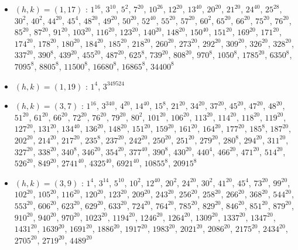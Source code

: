 \begin{itemize}
\item $(h,k)=(1,17)$ : $1^{16}$, $3^{10}$, $5^{2}$, $7^{20}$, $10^{26}$, $12^{20}$, $13^{40}$, $20^{20}$, $21^{20}$, $24^{40}$, $25^{28}$, $30^{2}$, $40^{2}$, $44^{20}$, $45^{4}$, $48^{20}$, $49^{20}$, $50^{20}$, $52^{40}$, $55^{20}$, $57^{20}$, $60^{2}$, $65^{20}$, $66^{20}$, $75^{20}$, $76^{20}$, $85^{20}$, $87^{20}$, $91^{20}$, $103^{20}$, $116^{20}$, $123^{20}$, $140^{20}$, $148^{20}$, $150^{40}$, $151^{20}$, $169^{20}$, $171^{20}$, $174^{20}$, $178^{20}$, $180^{20}$, $184^{20}$, $185^{20}$, $218^{20}$, $260^{20}$, $273^{20}$, $292^{20}$, $309^{20}$, $326^{20}$, $328^{20}$, $337^{20}$, $390^{8}$, $439^{20}$, $455^{20}$, $487^{20}$, $625^{8}$, $739^{20}$, $808^{20}$, $970^{8}$, $1050^{8}$, $1785^{20}$, $6350^{8}$, $7095^{8}$, $8805^{8}$, $11500^{8}$, $16680^{8}$, $16865^{8}$, $34400^{8}$
\item $(h,k)=(1,19)$ : $1^{4}$, $3^{349524}$
\item $(h,k)=(3,7)$ : $1^{16}$, $3^{340}$, $4^{20}$, $14^{40}$, $15^{8}$, $21^{20}$, $34^{20}$, $37^{20}$, $45^{20}$, $47^{20}$, $48^{20}$, $51^{20}$, $61^{20}$, $66^{20}$, $72^{20}$, $76^{20}$, $79^{20}$, $80^{2}$, $101^{20}$, $106^{20}$, $113^{20}$, $114^{20}$, $118^{20}$, $119^{20}$, $127^{20}$, $131^{20}$, $134^{40}$, $136^{20}$, $148^{20}$, $151^{20}$, $159^{20}$, $161^{20}$, $164^{20}$, $177^{20}$, $185^{8}$, $187^{20}$, $202^{20}$, $214^{20}$, $217^{20}$, $235^{8}$, $237^{20}$, $242^{20}$, $250^{20}$, $251^{20}$, $279^{20}$, $280^{8}$, $294^{20}$, $311^{20}$, $327^{20}$, $338^{20}$, $340^{8}$, $346^{20}$, $354^{20}$, $377^{40}$, $390^{8}$, $430^{20}$, $440^{4}$, $466^{20}$, $471^{20}$, $514^{20}$, $526^{20}$, $849^{20}$, $2741^{40}$, $4325^{40}$, $6921^{40}$, $10855^{8}$, $20915^{8}$
\item $(h,k)=(3,9)$ : $1^{4}$, $3^{14}$, $5^{10}$, $10^{2}$, $12^{40}$, $20^{2}$, $24^{20}$, $30^{2}$, $41^{20}$, $45^{4}$, $73^{20}$, $99^{20}$, $102^{20}$, $105^{20}$, $116^{20}$, $120^{20}$, $123^{20}$, $209^{20}$, $243^{20}$, $256^{20}$, $258^{20}$, $266^{20}$, $368^{20}$, $544^{20}$, $553^{20}$, $606^{20}$, $623^{20}$, $629^{20}$, $633^{20}$, $724^{20}$, $764^{20}$, $785^{20}$, $829^{20}$, $846^{20}$, $851^{20}$, $879^{20}$, $910^{20}$, $940^{20}$, $970^{20}$, $1023^{20}$, $1194^{20}$, $1246^{20}$, $1264^{20}$, $1309^{20}$, $1337^{20}$, $1347^{20}$, $1431^{20}$, $1639^{20}$, $1691^{20}$, $1886^{20}$, $1917^{20}$, $1983^{20}$, $2021^{20}$, $2086^{20}$, $2175^{20}$, $2434^{20}$, $2705^{20}$, $2719^{20}$, $4489^{20}$

\end{itemize}
